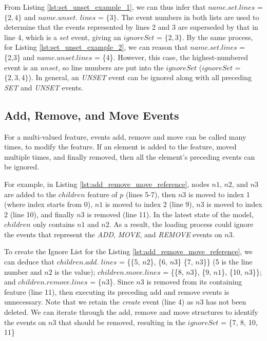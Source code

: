 \documentclass{llncs}
\begin{document}
    From Listing \ref{lst:set_unset_example_1}, we can thus infer that $name$.$set$.$lines$ = $\{2,4\}$ and $name$.$unset$. $lines$ = $\{3\}$. The event numbers in both lists are used to determine that the events represented by lines 2 and 3 are superseded by that in line 4, which is a $set$ event, giving an $ignoreSet$ = $\{2, 3\}$.  By the same process, for Listing \ref{lst:set_unset_example_2}, we can reason that $name$.$set$.$lines$ = \{2,3\} and $name$.$unset$.$lines$ = \{4\}.  However, this case, the highest-numbered event is an $unset$, so line numbers are put into the $ignoreSet$ ($ignoreSet$ = $\{2, 3, 4\}$). In general, an \textit{UNSET} event can be ignored along with all preceding \textit{SET} and \textit{UNSET} events. 
    
    \subsection{Add, Remove, and Move Events}\label{subsec:add_remove_and_move_operations}
    For a multi-valued feature, events add, remove and move can be called many times, to modify the feature. If an element is added to the feature, moved multiple times, and finally removed, then all the element's preceding events can be ignored. 
    
    For example, in Listing \ref{lst:add_remove_move_reference},  nodes $n1$, $n2$, and $n3$ are added to the $children$ feature of $p$ (lines 5-7), then $n3$ is moved to index 1 (where index starts from 0), $n1$ is moved to index 2 (line 9), $n3$ is moved to index 2 (line 10), and finally $n3$ is removed (line 11).  In the latest state of the model, $children$ only contains $n1$ and $n2$. As a result, the loading process could ignore the events that represent the \textit{ADD}, \textit{MOVE}, and \textit{REMOVE} events on $n3$. 
    
    To create the Ignore List for the Listing \ref{lst:add_remove_move_reference}, we can deduce that $children$.$add$. $lines$ = \{\{5, $n2$\}, \{6, $n3$\} \{7, $n3$\}\} (5 is the line number and $n2$ is the value); $children$.$move$.$lines$ = \{\{8, $n3$\}, \{9, $n1$\}, \{10, $n3$\}\}; and $children$.$remove$.$lines$ = \{$n$3\}. Since $n3$ is removed from its containing feature (line 11), then executing its preceding add and remove events is unnecessary. Note that we retain the \textit{create} event (line 4) as $n3$ has not been deleted.  We can iterate through the add, remove and move structures to identify the events on $n3$ that should be removed, resulting in the $ignoreSet$ = \{7, 8, 10, 11\}
    
\end{document}
